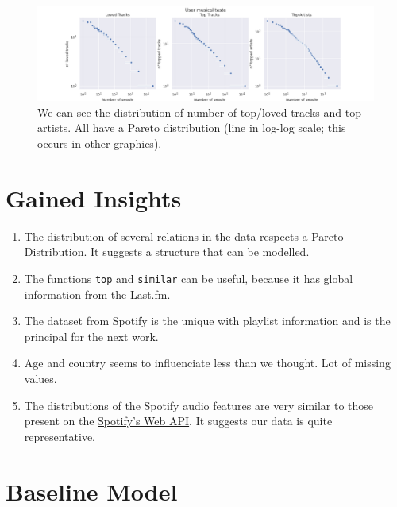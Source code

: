 \documentclass{article}
\begin{document}
\begin{figure}[!h]
  \centering
  \label{fig:top-loved}
  \includegraphics[width = \textwidth]{../../images/top-loved-tracks.png}
  \caption{We can see the distribution of number of top/loved tracks and top artists. All have a Pareto distribution (line in log-log scale; this occurs in other graphics).}
\end{figure}

\section{Gained Insights}

\begin{enumerate}
  \item The distribution of several relations in the data respects a Pareto
  Distribution. It suggests a structure that can be modelled. 
  \item The functions \lstinline{top} and \lstinline{similar} can be useful,
  because it has global information from the Last.fm. 
  \item The dataset from Spotify is the unique with playlist information and
  is the principal for the next work. 
  \item Age and country seems to influenciate less than we thought. Lot of
  missing values.
  \item The distributions of the Spotify audio features are very similar to those
  present on the
  \href{https://developer.spotify.com/documentation/web-api/reference/tracks/get-audio-features/}{Spotify's Web API}.
  It suggests our data is quite representative.
\end{enumerate}

\section{Baseline Model}
\end{document}
